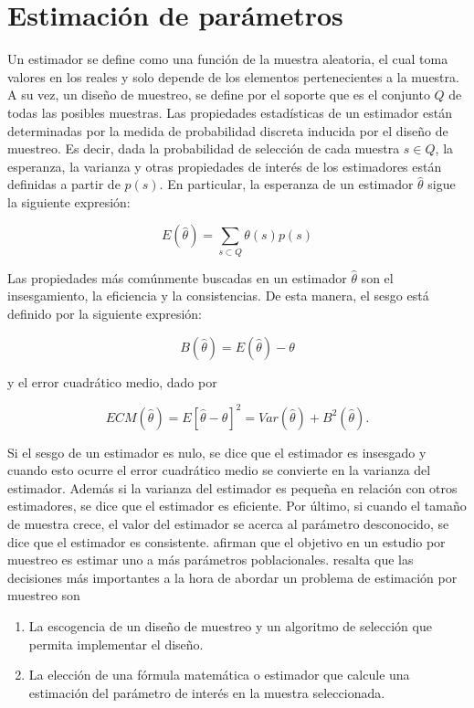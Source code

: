 \documentclass[
  12pt,
]{book}
\providecommand{\tightlist}{%
  \setlength{\itemsep}{0pt}\setlength{\parskip}{0pt}}
\begin{document}
\hypertarget{estimaciuxf3n-de-paruxe1metros}{%
\chapter{Estimación de parámetros}\label{estimaciuxf3n-de-paruxe1metros}}

Un estimador se define como una función de la muestra aleatoria, el cual toma valores en los reales y solo depende de los elementos pertenecientes a la muestra. A su vez, un diseño de muestreo, se define por el soporte que es el conjunto \(Q\) de todas las posibles muestras. Las propiedades estadísticas de un estimador están determinadas por la medida de probabilidad discreta inducida por el diseño de muestreo. Es decir, dada la probabilidad de selección de cada muestra \(s \in Q\), la esperanza, la varianza y otras propiedades de interés de los estimadores están definidas a partir de \(p(s)\). En particular, la esperanza de un estimador \(\hat\theta\) sigue la siguiente expresión:

\[
E(\hat\theta) = \sum_{s\subset Q} \theta(s)p(s)
\]

Las propiedades más comúnmente buscadas en un estimador \(\hat\theta\) son el insesgamiento, la eficiencia y la consistencias. De esta manera, el sesgo está definido por la siguiente expresión:

\[
B(\hat\theta)=E(\hat\theta)-\theta
\]

y el error cuadrático medio, dado por

\[
ECM(\hat\theta)=E[\hat\theta-\theta]^2=Var(\hat\theta)+B^2(\hat\theta).
\]

Si el sesgo de un estimador es nulo, se dice que el estimador es insesgado y cuando esto ocurre el error cuadrático medio se convierte en la varianza del estimador. Además si la varianza del estimador es pequeña en relación con otros estimadores, se dice que el estimador es eficiente. Por último, si cuando el tamaño de muestra crece, el valor del estimador se acerca al parámetro desconocido, se dice que el estimador es consistente. \citet{Sarndal_Swensson_Wretman_2003} afirman que el objetivo en un estudio por muestreo es estimar uno a más parámetros poblacionales. \citet{Gutierrez_2016} resalta que las decisiones más importantes a la hora de abordar un problema de estimación por muestreo son

\begin{enumerate}
\def\labelenumi{\arabic{enumi}.}
\tightlist
\item
  La escogencia de un diseño de muestreo y un algoritmo de selección que permita implementar el diseño.
\item
  La elección de una fórmula matemática o estimador que calcule una estimación del parámetro de interés en la muestra seleccionada.
\end{enumerate}
\end{document}
